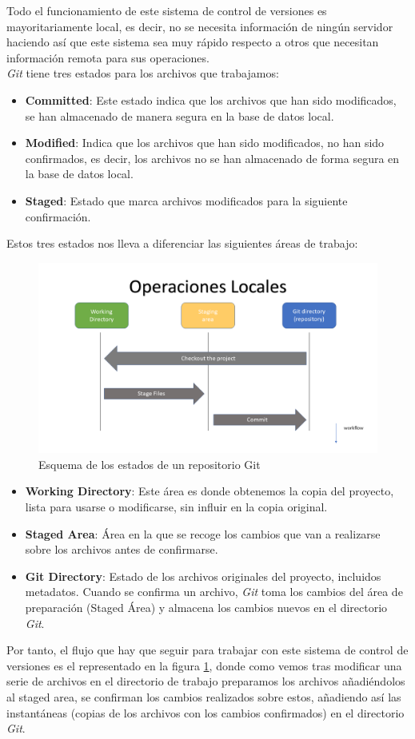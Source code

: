 Todo el funcionamiento de este sistema de control de versiones es mayoritariamente local, es decir, no se necesita información de ningún servidor haciendo así que este sistema sea muy rápido respecto a otros que necesitan información remota para sus operaciones. \\
\emph{Git} tiene tres estados para los archivos que trabajamos:
\begin{itemize}
    \item \textbf{Committed}: Este estado indica que los archivos que han sido modificados, se han almacenado de manera segura en la base de datos local.
    \item \textbf{Modified}: Indica que los archivos que han sido modificados, no han sido confirmados, es decir, los archivos no se han almacenado de forma segura en la base de datos local.
    \item \textbf{Staged}: Estado que marca archivos modificados para la siguiente confirmación.
\end{itemize}
Estos tres estados nos lleva a diferenciar las siguientes áreas de trabajo:
\begin{figure}[ht]
    \centering
    \includegraphics[width=\textwidth]{img/git_states.png}
    \caption{ Esquema de los estados de un repositorio Git}
    \label{fig:gitStates}
\end{figure}
\begin{itemize}
    \item \textbf{Working Directory}: Este área es donde obtenemos la copia del proyecto, lista para usarse o modificarse, sin influir en la copia original.
    \item \textbf{Staged Area}: Área en la que se recoge los cambios que van a realizarse sobre los archivos antes de confirmarse.
    \item \textbf{Git Directory}: Estado de los archivos originales del proyecto, incluidos metadatos. Cuando se confirma un archivo, \emph{Git} toma los cambios del área de preparación (Staged Área) y almacena los cambios nuevos en el directorio \emph{Git}.
\end{itemize}
Por tanto, el flujo que hay que seguir para trabajar con este sistema de control de versiones es el representado en la figura \ref{fig:gitStates}, donde como vemos tras modificar una serie de archivos en el directorio de trabajo preparamos los archivos añadiéndolos al staged area, se confirman los cambios realizados sobre estos, añadiendo así las instantáneas (copias de los archivos con los cambios confirmados) en el directorio \emph{Git}.

